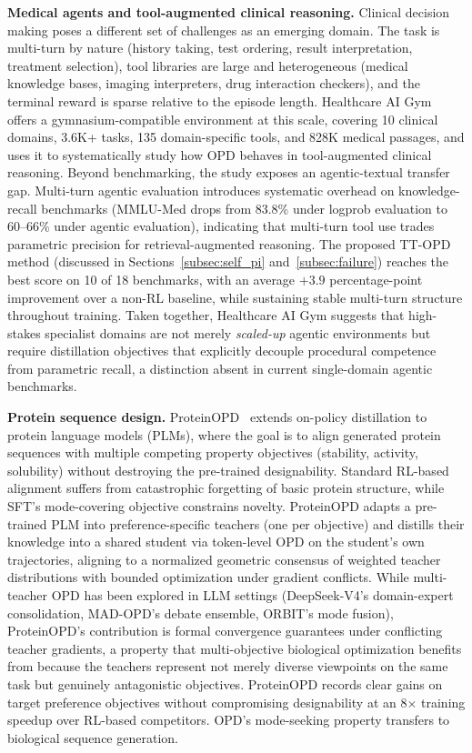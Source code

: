 \documentclass{article} %
\begin{document}
\textbf{Medical agents and tool-augmented clinical reasoning.} Clinical decision making poses a different set of challenges as an emerging domain. The task is multi-turn by nature (history taking, test ordering, result interpretation, treatment selection), tool libraries are large and heterogeneous (medical knowledge bases, imaging interpreters, drug interaction checkers), and the terminal reward is sparse relative to the episode length. Healthcare AI Gym~\citep{2605.02943} offers a gymnasium-compatible environment at this scale, covering 10 clinical domains, 3.6K+ tasks, 135 domain-specific tools, and 828K medical passages, and uses it to systematically study how OPD behaves in tool-augmented clinical reasoning. Beyond benchmarking, the study exposes an agentic-textual transfer gap. Multi-turn agentic evaluation introduces systematic overhead on knowledge-recall benchmarks (MMLU-Med drops from 83.8\% under logprob evaluation to 60--66\% under agentic evaluation), indicating that multi-turn tool use trades parametric precision for retrieval-augmented reasoning. The proposed TT-OPD method (discussed in Sections~\ref{subsec:self_pi} and~\ref{subsec:failure}) reaches the best score on 10 of 18 benchmarks, with an average $+3.9$ percentage-point improvement over a non-RL baseline, while sustaining stable multi-turn structure throughout training. Taken together, Healthcare AI Gym suggests that high-stakes specialist domains are not merely \emph{scaled-up} agentic environments but require distillation objectives that explicitly decouple procedural competence from parametric recall, a distinction absent in current single-domain agentic benchmarks.

\textbf{Protein sequence design.} ProteinOPD~\citep{2605.10189} extends on-policy distillation to protein language models (PLMs), where the goal is to align generated protein sequences with multiple competing property objectives (stability, activity, solubility) without destroying the pre-trained designability. Standard RL-based alignment suffers from catastrophic forgetting of basic protein structure, while SFT's mode-covering objective constrains novelty. ProteinOPD adapts a pre-trained PLM into preference-specific teachers (one per objective) and distills their knowledge into a shared student via token-level OPD on the student's own trajectories, aligning to a normalized geometric consensus of weighted teacher distributions with bounded optimization under gradient conflicts. While multi-teacher OPD has been explored in LLM settings (DeepSeek-V4's domain-expert consolidation, MAD-OPD's debate ensemble, ORBIT's mode fusion), ProteinOPD's contribution is formal convergence guarantees under conflicting teacher gradients, a property that multi-objective biological optimization benefits from because the teachers represent not merely diverse viewpoints on the same task but genuinely antagonistic objectives. ProteinOPD records clear gains on target preference objectives without compromising designability at an 8$\times$ training speedup over RL-based competitors. OPD's mode-seeking property transfers to biological sequence generation.
\end{document}
